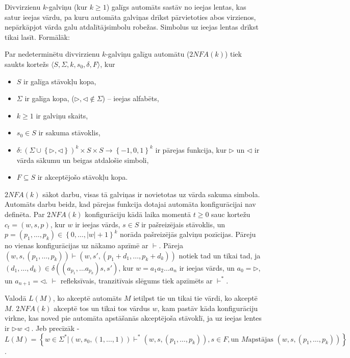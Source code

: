 \documentclass{ludis}
\begin{document}
Divvirzienu $k$-galviņu (kur $k\geq 1$) galīgs automāts sastāv no ieejas lentas, kas satur ieejas vārdu, pa kuru automāta galviņas drīkst pārvietoties abos virzienos, nepārkāpjot vārda galu atdalītājsimbolu  robežas. Simbolus uz ieejas lentas drīkst tikai lasīt. Formālāk:
\begin{definicija}
Par nedeterminētu divvirzienu $k$-galviņu galīgu automātu ($2NFA(k)$) tiek saukts kortežs $\langle S, \Sigma, k, s_0, \delta, F \rangle$, kur
\begin{itemize}
	\item $S$ ir galīga stāvokļu kopa,
	\item $\Sigma$ ir galīga kopa, ($ \triangleright,\triangleleft \notin \Sigma$) -- ieejas alfabēts,
	\item $k\geq 1$ ir galviņu skaits, 
	\item $s_0\in S$ ir sakuma stāvoklis,
	\item $\delta: \left( \Sigma \cup \left\{ \triangleright, \triangleleft \right\} \right)^k \times S \times S \rightarrow \left\{-1,0,1\right\}^k$ ir pārejas funkcija, kur $\triangleright$ un $\triangleleft$ ir vārda sākumu un beigas atdalošie simboli,
	\item $F \subseteq S$ ir akceptējošo stāvokļu kopa.
\end{itemize}
\end{definicija}
$2NFA(k)$ sākot darbu, visas tā galviņas ir novietotas uz vārda sakuma simbola. Automāts darbu beidz, kad pārejas funkcija dotajai automāta konfigurācijai nav definēta. Par $2NFA(k)$ konfigurāciju kādā laika momentā $t\geq 0$ sauc kortežu $c_t=\left(w,s,p\right)$, kur $w$ ir ieejas vārds, $s\in S$ ir pašreizējais stāvoklis, un
$p = \left( p_1, \ldots, p_k \right) \in \left\{ 0, \ldots, |w| +1 \right\}^k $
norāda pašreizējās galviņu pozīcijas. Pāreju no vienas konfigurācijas uz nākamo apzīmē ar $\vdash$. Pāreja
$\left( w, s, \left( p_1, \ldots, p_k \right) \right) \vdash \left( w, s', \left( p_1+d_1, \ldots, p_k+d_k \right) \right)$
notiek tad un tikai tad, ja
$\left(d_1, \ldots, d_k \right) \in \delta \left( \left( a_{p_1}, \ldots a_{p_k} \right) s, s' \right)$,
kur $w = a_1a_2 \ldots a_n$ ir ieejas vārds, un $a_0=\triangleright$, un $a_{n+1}=\triangleleft$. $\vdash$ refleksīvais, tranzitīvais slēgums tiek apzīmēts ar $\vdash^*$.

Valodā $L(M)$, ko akceptē automāts $M$ ietilpst tie un tikai tie vārdi, ko akceptē $M$. $2NFA(k)$ akceptē tos un tikai tos vārdus $w$, kam pastāv kāda konfigurāciju virkne, kas noved pie automāta apstāšanās akceptējoša stāvoklī, ja uz ieejas lentes ir
$\triangleright w \triangleleft$. Jeb precīzāk - $L(M)=\left\{ w \in \Sigma^* | \left(w,s_0,\left(1,\ldots,1\right)\right) \vdash^* \left(w,s,\left(p_1,\ldots,p_k\right)\right), s \in F, \textrm{un } M \textrm{apstājas } \left(w,s,\left(p_1,\ldots,p_k\right)\right)\right\}$. %
\end{document}
